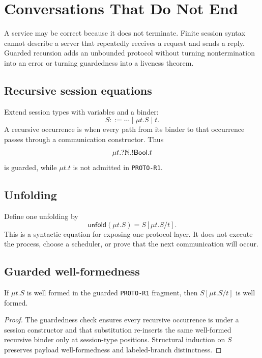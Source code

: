 \chapter{Conversations That Do Not End}

A service may be correct because it does not terminate. Finite session syntax cannot describe a server that repeatedly receives a request and sends a reply. Guarded recursion adds an unbounded protocol without turning nontermination into an error or turning guardedness into a liveness theorem.

\section{Recursive session equations}
Extend session types with variables and a binder:
\[
S ::= \cdots \mid \mu t.S \mid t.
\]
A recursive occurrence is  when every path from its binder to that occurrence passes through a communication constructor. Thus
\[
\mu t.?\mathbb{N}.!\mathsf{Bool}.t
\]
is guarded, while $\mu t.t$ is not admitted in \texttt{PROTO-R1}.



\section{Unfolding}
Define one unfolding by
\[
\mathsf{unfold}(\mu t.S)=S[\mu t.S/t].
\]
This is a syntactic equation for exposing one protocol layer. It does not execute the process, choose a scheduler, or prove that the next communication will occur.

\section{Guarded well-formedness}
\begin{theorem}
If $\mu t.S$ is well formed in the guarded \texttt{PROTO-R1} fragment, then $S[\mu t.S/t]$ is well formed.
\end{theorem}
\begin{proof}
The guardedness check ensures every recursive occurrence is under a session constructor and that substitution re-inserts the same well-formed recursive binder only at session-type positions. Structural induction on $S$ preserves payload well-formedness and labeled-branch distinctness.
\end{proof}

